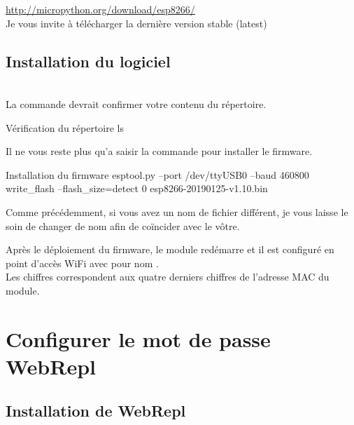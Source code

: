 \url{http://micropython.org/download/esp8266/}\\

Je vous invite à télécharger la dernière version stable (latest)


\section{Installation du logiciel}

 \\

La commande  devrait confirmer votre contenu du répertoire.

\begin{Bash}{Vérification du répertoire}
ls
\end{Bash}


Il ne vous reste plus qu'a saisir la commande pour installer le firmware. \\
\begin{Bash}{Installation du firmware}
esptool.py --port /dev/ttyUSB0 --baud 460800 write_flash --flash_size=detect 0 esp8266-20190125-v1.10.bin
\end{Bash}

Comme précédemment, si vous avez un nom de fichier différent, je vous laisse le soin de changer de nom afin de coïncider avec le vôtre.


Après le déploiement du firmware, le module redémarre et il est configuré en point d’accès WiFi avec pour nom . \\ Les chiffres correspondent aux quatre derniers chiffres de l'adresse MAC du module. 


\chapter{Configurer le mot de passe \\WebRepl}

\section{Installation de WebRepl}

